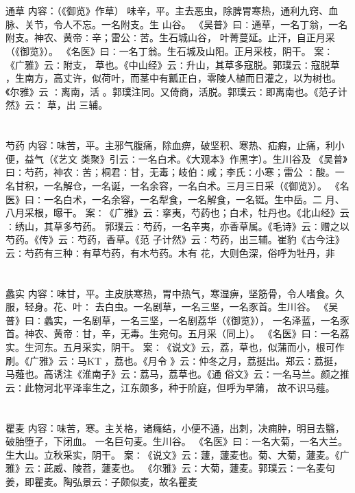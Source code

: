\documentclass[12pt,UTF8]{ctexbook}
\begin{document}
\chapter{}通草
内容：（《御览》作草） 
味辛，平。主去恶虫，除脾胃寒热，通利九窍、血脉、关节，令人不忘。一名附支。生 
山谷。 
《吴普》曰∶通草，一名丁翁，一名附支。神农、黄帝∶辛；雷公∶苦。生石城山谷， 
叶菁蔓延。止汗，自正月采（《御览》）。 
《名医》曰∶一名丁翁。生石城及山阳。正月采枝，阴干。 
案∶《广雅》云∶附支， 草也。《中山经》云∶升山，其草多寇脱。郭璞云∶寇脱草 
，生南方，高丈许，似荷叶，而茎中有瓤正白，零陵人植而日灌之，以为树也。《尔雅》云 
∶离南，活 。郭璞注同。又倚商，活脱。郭璞云∶即离南也。《范子计然》云∶ 草，出 
三辅。 


\chapter{}芍药
内容：味苦，平。主邪气腹痛，除血痹，破坚积、寒热、疝瘕，止痛，利小便，益气（《艺文 
类聚》引云∶一名白术。《大观本》作黑字）。生川谷及 
《吴普》曰∶芍药，神农∶苦；桐君∶甘，无毒；岐伯∶咸；李氏∶小寒；雷公 
∶酸。一名甘积，一名解仓，一名诞，一名余容，一名白术。三月三日采（《御览》）。 
《名医》曰∶一名白术，一名余容，一名犁食，一名解食，一名铤。生中岳。二 
月、八月采根，曝干。 
案∶《广雅》云∶挛夷，芍药也；白术，牡丹也。《北山经》云∶绣山，其草多芍药。 
郭璞云∶芍药，一名辛夷，亦香草属。《毛诗》云∶赠之以芍药。《传》云∶芍药，香草。《范 
子计然》云∶芍药，出三辅。崔豹《古今注》云∶芍药有三种∶有草芍药，有木芍药。木有 
花，大则色深，俗呼为牡丹，非 


\chapter{}蠡实
内容：味甘，平。主皮肤寒热，胃中热气，寒湿痹，坚筋骨，令人嗜食。久服，轻身。花、叶∶ 
去白虫。一名剧草，一名三坚，一名豕首。生川谷。 
《吴普》曰∶蠡实，一名剧草，一名三坚，一名剧荔华（《御览》）， 
一名泽蓝，一名豕首。神农、黄帝∶甘，辛，无毒。生宛句。五月采（同上）。 
《名医》曰∶一名荔实。生河东。五月采实，阴干。 
案∶《说文》云，荔，草也，似蒲而小，根可作刷。《广雅》云∶马KT ，荔也。《月令 
》云∶仲冬之月，荔挺出。郑云∶荔挺，马薤也。高诱注《淮南子》云∶荔马，荔草也。《通 
俗文》云∶一名马兰。颜之推云∶此物河北平泽率生之，江东颇多，种于阶庭，但呼为早蒲， 
故不识马薤。 


\chapter{}瞿麦
内容：味苦，寒。主关格，诸癃结，小便不通，出刺，决痈肿，明目去翳，破胎堕子，下闭血。 
一名巨句麦。生川谷。 
《名医》曰∶一名大菊，一名大兰。生大山。立秋采实，阴干。 
案∶《说文》云∶蘧，蘧麦也。菊、大菊，蘧麦。《广雅》云∶茈威、陵苕，蘧麦也。 
《尔雅》云∶大菊，蘧麦。郭璞云∶一名麦句姜，即瞿麦。陶弘景云∶子颇似麦，故名瞿麦 
\end{document}
